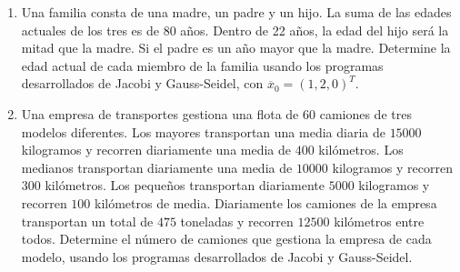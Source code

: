 \documentclass[
	spanish,
	8pt,
	utf8,
	xcolor=table,
	handout,
	aspectratio=169,
	professionalfonts,
	notheorems,
	mathserif,
]{beamer}
\newcounter{savedenum}
\newcommand*{\saveenum}{\setcounter{savedenum}{\theenumi}}
\begin{document}
\begin{frame}
\begin{enumerate}
		\item

		      Una familia consta de una madre, un padre y un hijo.
		      La suma de las edades actuales de los tres es de $80$ años.
		      Dentro de 22 años, la edad del hijo será la mitad que la
		      madre.
		      Si el padre es un año mayor que la madre.
		      Determine la edad actual de cada miembro de la familia
		      usando los programas desarrollados de Jacobi y
		      Gauss-Seidel, con
		      \begin{math}
			      \overline{x}_{0}=
			      {\left(1,2,0\right)}^{T}
		      \end{math}.

		\item

		      Una empresa de transportes gestiona una flota de $60$
		      camiones de tres modelos diferentes.
		      Los mayores transportan una media diaria de $15000$
		      kilogramos y recorren diariamente una media de $400$
		      kilómetros.
		      Los medianos transportan diariamente una media de $10000$
		      kilogramos y recorren $300$ kilómetros.
		      Los pequeños transportan diariamente $5000$ kilogramos y
		      recorren $100$ kilómetros de media.
		      Diariamente los camiones de la empresa transportan un total
		      de $475$ toneladas y recorren $12500$ kilómetros entre todos.
		      Determine el número de camiones que gestiona la empresa de
		      cada modelo, usando los programas desarrollados de Jacobi y
		      Gauss-Seidel.
		      \saveenum
	\end{enumerate}
\end{frame}
\end{document}
